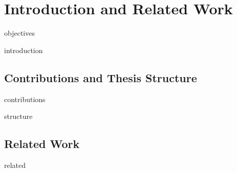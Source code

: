 \chapter{Introduction and Related Work}

{objectives}

{introduction}

\section{Contributions and Thesis Structure}
{contributions}

{structure}

\section{Related Work} \label{sec:related}
{related}
